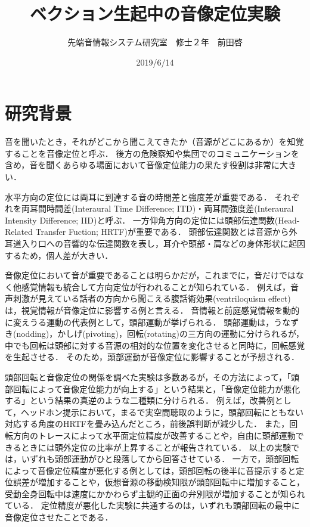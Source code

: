 \documentclass[12pt,a4j]{jsarticle}
\title{ベクション生起中の音像定位実験}
\author{先端音情報システム研究室　修士２年　前田啓}
\date{2019/6/14}
\renewcommand{\ }{\hspace{1zw}}
\begin{document}
\maketitle
\section{研究背景}
音を聞いたとき，それがどこから聞こえてきたか（音源がどこにあるか）を知覚することを音像定位と呼ぶ．
後方の危険察知や集団でのコミュニケーションを含め，音を聞くあらゆる場面において音像定位能力の果たす役割は非常に大きい．

水平方向の定位には両耳に到達する音の時間差と強度差が重要である．
それぞれを両耳間時間差(Interaural Time Difference; ITD)・両耳間強度差(Interaural Intensity Difference; IID)と呼ぶ．
一方仰角方向の定位には頭部伝達関数(Head-Related Transfer Fuction; HRTF)が重要である．
頭部伝達関数とは音源から外耳道入り口への音響的な伝達関数を表し，耳介や頭部・肩などの身体形状に起因するため，個人差が大きい．

音像定位において音が重要であることは明らかだが，これまでに，音だけではなく他感覚情報も統合して方向定位が行われることが知られている．
例えば，音声刺激が見えている話者の方向から聞こえる腹話術効果(ventriloquism effect)は，視覚情報が音像定位に影響する例と言える．
音情報と前庭感覚情報を動的に変えうる運動の代表例として，頭部運動が挙げられる．
頭部運動は，うなずき(nodding)，かしげ(pivoting)，回転(rotating)の三方向の運動に分けられるが，中でも回転は頭部に対する音源の相対的な位置を変化させると同時に，回転感覚を生起させる．
そのため，頭部運動が音像定位に影響することが予想される．

頭部回転と音像定位の関係を調べた実験は多数あるが，その方法によって，「頭部回転によって音像定位能力が向上する」という結果と，「音像定位能力が悪化する」という結果の真逆のような二種類に分けられる．
例えば，改善例として，ヘッドホン提示において，まるで実空間聴取のように，頭部回転にともない対応する角度のHRTFを畳み込んだところ，前後誤判断が減少した\cite{Kawaura}．
また，回転方向のトレースによって水平面定位精度が改善すること\cite{Iwaya}や，自由に頭部運動できるときには頭外定位の比率が上昇すること\cite{Brimijoin}が報告されている．
以上の実験では，いずれも頭部運動がひと段落してから回答させている．
一方で，頭部回転によって音像定位精度が悪化する例としては，頭部回転の後半に音提示すると定位誤差が増加すること\cite{Cooper}や，仮想音源の移動検知限が頭部回転中に増加すること\cite{Honda}，受動全身回転中は速度にかかわらず主観的正面の弁別限が増加すること\cite{Masumi}\cite{Tsuno}が知られている．
定位精度が悪化した実験に共通するのは，いずれも頭部回転の最中に音像定位させたことである．
\end{document}
